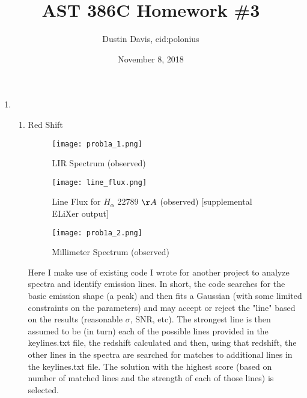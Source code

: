 \documentclass[11pt]{article}
\title{AST 386C Homework \#3}
\author{Dustin Davis, eid:polonius}
\date{November 8, 2018}
\begin{document}
\maketitle



\newpage 



\begin{enumerate}
\item  %
	
	\begin{enumerate}
	\item Red Shift\\
	
    \begin{figure}[H]
		\texttt{[image: prob1a\_1.png]}
		\caption{LIR Spectrum (observed)}
		\label{}
	\end{figure}
	
		\begin{figure}[H]
				\texttt{[image: line\_flux.png]}
				\caption{Line Flux for $H_{\alpha}$  22789 $\AA$ (observed) [supplemental ELiXer output] }
				\label{fig:int_line_flux}
		\end{figure}
	
	\begin{figure}[H]
			\texttt{[image: prob1a\_2.png]}
			\caption{Millimeter Spectrum (observed)}
			\label{fig:gal_mm_spec}
	\end{figure}
	  
	Here I make use of existing code I wrote for another project to analyze spectra and identify emission lines. In short, the code searches for the basic emission shape (a peak) and then fits a Gaussian (with some limited constraints on the parameters) and may accept or reject the "line" based on the results (reasonable $\sigma$, SNR, etc). The strongest line is then assumed to be (in turn) each of the possible lines provided in the keylines.txt file, the redshift calculated and then, using that redshift, the other lines in the spectra are searched for matches to additional lines in the keylines.txt file. The solution with the highest score (based on number of matched lines and the strength of each of those lines) is selected.\\
	

\end{enumerate}
\end{enumerate}
\end{document}
